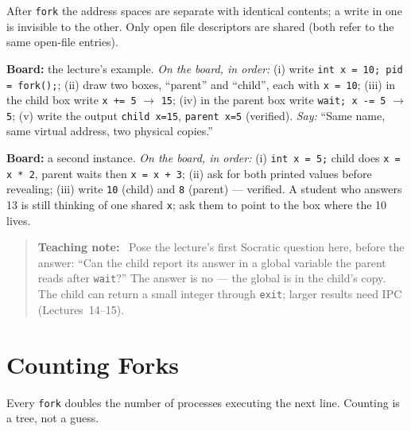 \documentclass[11pt]{article}
\newenvironment{teachingaside}{\begin{quote}\small\color{primary-gold}\textbf{Teaching note:}\ }{\end{quote}}
\begin{document}
After \texttt{fork} the address spaces are separate with identical contents; a write in one is invisible to the other. Only open file descriptors are shared (both refer to the same open-file entries).

\textbf{Board:} the lecture's example. \emph{On the board, in order:} (i) write \texttt{int x = 10; pid = fork();}; (ii) draw two boxes, ``parent'' and ``child'', each with \texttt{x = 10}; (iii) in the child box write \texttt{x += 5} $\to$ \texttt{15}; (iv) in the parent box write \texttt{wait; x -= 5} $\to$ \texttt{5}; (v) write the output \texttt{child x=15}, \texttt{parent x=5} (verified). \emph{Say:} ``Same name, same virtual address, two physical copies.''

\textbf{Board:} a second instance. \emph{On the board, in order:} (i) \texttt{int x = 5;} child does \texttt{x = x * 2}, parent waits then \texttt{x = x + 3}; (ii) ask for both printed values before revealing; (iii) write \texttt{10} (child) and \texttt{8} (parent) --- verified. A student who answers 13 is still thinking of one shared \texttt{x}; ask them to point to the box where the 10 lives.

\begin{teachingaside}
Pose the lecture's first Socratic question here, before the answer: ``Can the child report its answer in a global variable the parent reads after \texttt{wait}?'' The answer is no --- the global is in the child's copy. The child can return a small integer through \texttt{exit}; larger results need IPC (Lectures~14--15).
\end{teachingaside}

\section{Counting Forks}

Every \texttt{fork} doubles the number of processes executing the next line. Counting is a tree, not a guess.
\end{document}
